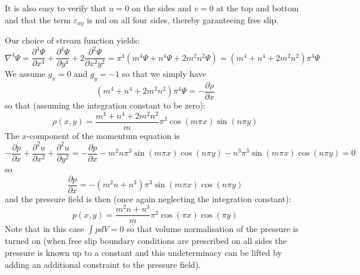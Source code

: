 It is also easy to verify that $u=0$ on the sides and $v=0$ at the top and bottom and that the 
term $\dot\varepsilon_{xy}$ is nul on all four sides, thereby garanteeing free slip. 

Our choice of stream function yields:
\[
{\nabla}^4 \Psi= 
\frac{\partial^4 \Psi}{\partial x^4}+
\frac{\partial^4 \Psi}{\partial y^4}+
2\frac{\partial^2 \Psi}{\partial x^2 y^2}
=\pi^4 ( m^4 \Psi + n^4 \Psi + 2m^2n^2 \Psi) = (m^4 + n^4 + 2m^2n^2)\pi^4 \Psi
\]
We assume $g_x=0$ and $g_y=-1$ so that we simply have 
\begin{equation}
(m^4 + n^4 + 2m^2n^2)\pi^4 \Psi = -\frac{\partial \rho}{\partial x}
\end{equation}
so that (assuming the integration constant to be zero):
\[
\rho(x,y) = \frac{m^4 + n^4 + 2m^2n^2}{m} \pi^3  \cos(m \pi x)\sin(n \pi y)
\]
The $x$-component of the momentum equation is 
\[
-\frac{\partial p}{\partial x} + 
\frac{\partial^2 u}{\partial x^2}+
\frac{\partial^2 u}{\partial y^2} =
-\frac{\partial p}{\partial x} 
-m^2 n \pi^3 \sin (m\pi x)\cos(n\pi y)
- n^3 \pi^3 \sin (m\pi x)\cos(n\pi y)
=0
\]
so 
\[
\frac{\partial p}{\partial x} =-(m^2n+n^3)\pi^3 \sin (m\pi x)\cos(n \pi y)
\]
and the pressure field is then (once again neglecting the integration constant):
\[
p(x,y)= \frac{m^2n+n^3}{m} \pi^2 \cos (\pi x)\cos(\pi y)
\]
Note that in this case $\int p dV =0$ so that volume normalisation of the pressure is turned on 
(when free slip boundary conditions are prescribed on all sides the pressure is known 
up to a constant and this undeterminacy can be lifted by adding an additional constraint 
to the pressure field).

